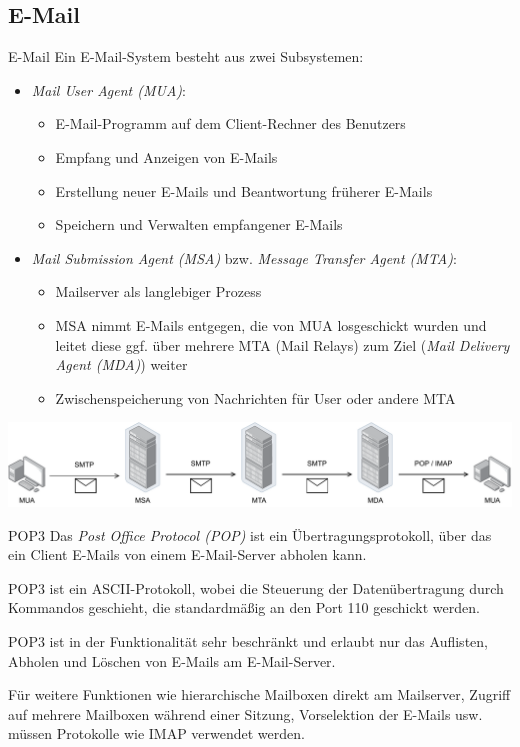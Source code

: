 \subsection{E-Mail}

\begin{defi}{E-Mail}
    Ein E-Mail-System besteht aus zwei Subsystemen:
    \begin{itemize}
        \item \emph{Mail User Agent (MUA)}:
              \begin{itemize}
                  \item E-Mail-Programm auf dem Client-Rechner des Benutzers
                  \item Empfang und Anzeigen von E-Mails
                  \item Erstellung neuer E-Mails und Beantwortung früherer E-Mails
                  \item Speichern und Verwalten empfangener E-Mails
              \end{itemize}
        \item \emph{Mail Submission Agent (MSA)} bzw. \emph{Message Transfer Agent (MTA)}:
              \begin{itemize}
                  \item Mailserver als langlebiger Prozess
                  \item MSA nimmt E-Mails entgegen, die von MUA losgeschickt wurden und leitet diese ggf. über mehrere MTA (Mail Relays) zum Ziel (\emph{Mail Delivery Agent (MDA)}) weiter
                  \item Zwischenspeicherung von Nachrichten für User oder andere MTA
              \end{itemize}
    \end{itemize}

    \centering
    \includegraphics[width=\textwidth]{includes/figures/defi_mail.pdf}
\end{defi}

\begin{bonus}{POP3}
    Das \emph{Post Office Protocol (POP)} ist ein Übertragungsprotokoll, über das ein Client E-Mails von einem E-Mail-Server abholen kann.

    POP3 ist ein ASCII-Protokoll, wobei die Steuerung der Datenübertragung durch Kommandos geschieht, die standardmäßig an den Port 110 geschickt werden.

    POP3 ist in der Funktionalität sehr beschränkt und erlaubt nur das Auflisten, Abholen und Löschen von E-Mails am E-Mail-Server.

    Für weitere Funktionen wie hierarchische Mailboxen direkt am Mailserver, Zugriff auf mehrere Mailboxen während einer Sitzung, Vorselektion der E-Mails usw. müssen Protokolle wie IMAP verwendet werden.
\end{bonus}

